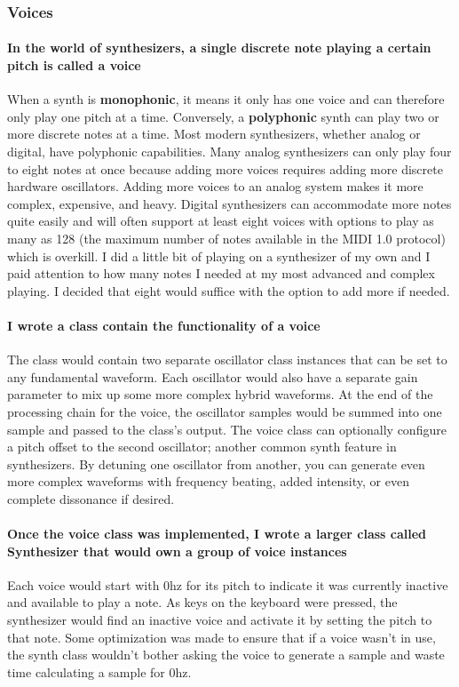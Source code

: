 \documentclass[acmlarge,screen]{acmart}
\begin{document}
	\subsubsection{Voices}
	\paragraph{In the world of synthesizers, a single discrete note playing a certain pitch is called a voice} When a synth is \textbf{monophonic}, it means it only has one voice and can therefore only play one pitch at a time. Conversely, a \textbf{polyphonic} synth can play two or more discrete notes at a time. Most modern synthesizers, whether analog or digital, have polyphonic capabilities. Many analog synthesizers can only play four to eight notes at once because adding more voices requires adding more discrete hardware oscillators. Adding more voices to an analog system makes it more complex, expensive, and heavy. Digital synthesizers can accommodate more notes quite easily and will often support at least eight voices with options to play as many as 128 (the maximum number of notes available in the MIDI 1.0 protocol) which is overkill. I did a little bit of playing on a synthesizer of my own and I paid attention to how many notes I needed at my most advanced and complex playing. I decided that eight would suffice with the option to add more if needed.
	
	\paragraph{I wrote a class contain the functionality of a voice} The class would contain two separate oscillator class instances that can be set to any fundamental waveform. Each oscillator would also have a separate gain parameter to mix up some more complex hybrid waveforms. At the end of the processing chain for the voice, the oscillator samples would be summed into one sample and passed to the class's output. The voice class can optionally configure a pitch offset to the second oscillator; another common synth feature in synthesizers. By detuning one oscillator from another, you can generate even more complex waveforms with frequency beating, added intensity, or even complete dissonance if desired.

	\paragraph{Once the voice class was implemented, I wrote a larger class called Synthesizer that would own a group of voice instances} Each voice would start with 0hz for its pitch to indicate it was currently inactive and available to play a note. As keys on the keyboard were pressed, the synthesizer would find an inactive voice and activate it by setting the pitch to that note. Some optimization was made to ensure that if a voice wasn't in use, the synth class wouldn't bother asking the voice to generate a sample and waste time calculating a sample for 0hz.
	
\end{document}
